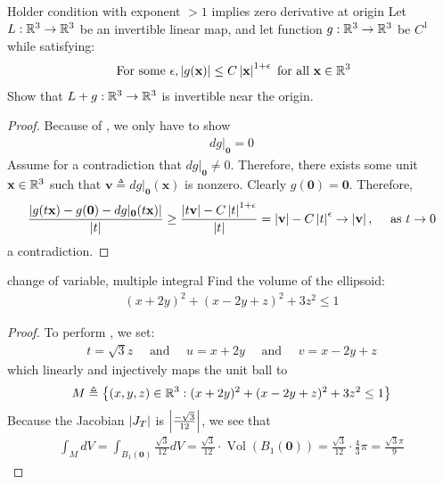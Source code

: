\documentclass{report}
\begin{document}
\begin{question}{Holder condition with exponent $>1$ implies zero derivative at origin}{}
Let $L:\mathbb{R}^3 \rightarrow \mathbb{R}^3$ be an invertible linear map, and let function $g:\mathbb{R}^3 \rightarrow \mathbb{R}^3$ be $C^1$ while satisfying: 
 \begin{align*}
\text{ For some }\epsilon ,\left|g(\textbf{x})\right|\leq C \left|\textbf{x}\right|^{1+\epsilon }\text{ for all }\textbf{x}\in\mathbb{R}^3
\end{align*}
Show that $L+g:\mathbb{R}^3 \rightarrow \mathbb{R}^3$ is invertible near the origin.  
\end{question}
\begin{proof}
 Because of , we only have to show 
\begin{align*}
dg |_\textbf{0}= 0
\end{align*}
Assume for a contradiction that $dg|_\textbf{0}\neq 0$. Therefore, there exists some unit $\textbf{x}\in\mathbb{R}^3$ such that $\textbf{v}\triangleq dg|_\textbf{0}(\textbf{x})$ is nonzero. Clearly $g(\textbf{0})=\textbf{0}$. Therefore, 
\begin{align*}
 \frac{\left|g(t\textbf{x})- g(\textbf{0})- dg|_\textbf{0}(t \textbf{x})\right|}{\left|t\right|} \geq \frac{\left|t \textbf{v}\right|- C\left|t\right|^{1+\epsilon }}{\left|t\right|} = \left|\textbf{v}\right| - C \left|t\right|^{\epsilon } \rightarrow \left|\textbf{v}\right|,\quad \text{ as }t \rightarrow 0
\end{align*}
a contradiction. 
\end{proof}
\begin{question}{change of variable, multiple integral}{}
Find the volume of the ellipsoid: 
\begin{align*}
  (x+2y)^2+ (x-2y+z)^2 +3z^2 \leq 1
\end{align*}
\end{question}
\begin{proof}
To perform , we set: 
\begin{align*}
t=\sqrt{3}z  \quad \text{ and }\quad u=x+2y \quad \text{ and }\quad v=x-2y+z
\end{align*}
which linearly and injectively maps the unit ball to
\begin{align*}
M\triangleq \left\{ (x,y,z)\in\mathbb{R}^3:(x+2y)^2 + (x-2y+z)^2 + 3z^2\leq  1 \right\}
\end{align*}
Because the Jacobian $\left|J_T\right|$ is $\left|\frac{-\sqrt{3} }{12}\right|$, we see that  
\begin{align*}
\int_M dV = \int_{B_1(\textbf{0})}  \frac{\sqrt{3}}{12}dV= \frac{\sqrt{3}}{12}\cdot \operatorname{Vol}(B_1(\textbf{0}))= \frac{\sqrt{3} }{12} \cdot \frac{4}{3} \pi = \frac{\sqrt{3} \pi }{9} 
\end{align*}
\end{proof}
\end{document}
